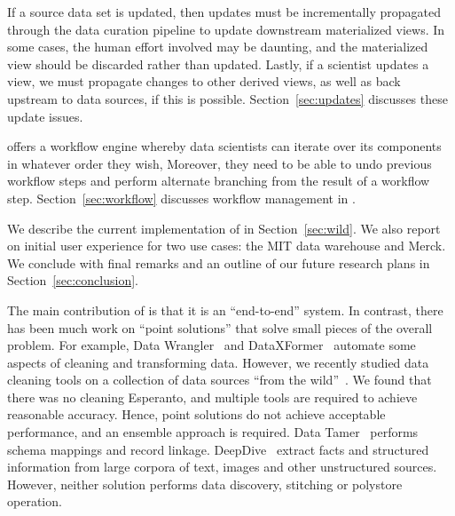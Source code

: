   If a source data set is updated, then updates must be incrementally propagated through the data curation pipeline to update downstream materialized views. In some cases, the human effort involved may be daunting, and the materialized view should be discarded rather than updated. Lastly, if a scientist updates a view, we must  propagate changes to other derived views, as well as back upstream to data sources, if this is possible. Section~\ref{sec:updates} discusses these update issues.



\stitle{[Workflow]} \dcv offers a workflow engine whereby data scientists can iterate over its components in whatever order they wish,  Moreover, they need to be able to undo previous workflow steps and perform alternate branching from the result of a workflow step.  Section~\ref{sec:workflow} discusses workflow management in \dcv.


We describe the current implementation of \dcv in Section~\ref{sec:wild}. We also report on initial user experience for two use cases: the MIT data warehouse and Merck. We conclude with final remarks and an outline of our future research plans in Section~\ref{sec:conclusion}.


The main contribution of \dcv is that it is an ``end-to-end'' system. In contrast, there has been much work on ``point solutions'' that solve small pieces of the overall problem. For example, Data Wrangler~\cite{2011-wrangler} and DataXFormer~\cite{DBLP:conf/icde/AbedjanMIOPS16} automate some aspects of cleaning and transforming data.  
However, we recently studied data cleaning tools on a collection of data sources ``from the wild''~\cite{DBLP:journals/pvldb/AbedjanCDFIOPST16}. We found that there was no cleaning Esperanto, and multiple tools are required to achieve reasonable accuracy.  Hence, point solutions do not achieve acceptable performance, and an ensemble approach is required. 
%
Data Tamer~\cite{DBLP:conf/cidr/StonebrakerBIBCZPX13} performs schema mappings and record linkage. DeepDive~\cite{DBLP:journals/pvldb/ShinWWSZR15} extract facts and structured information from large corpora of text, images and other unstructured sources. However, neither solution performs data discovery, stitching or polystore operation.

